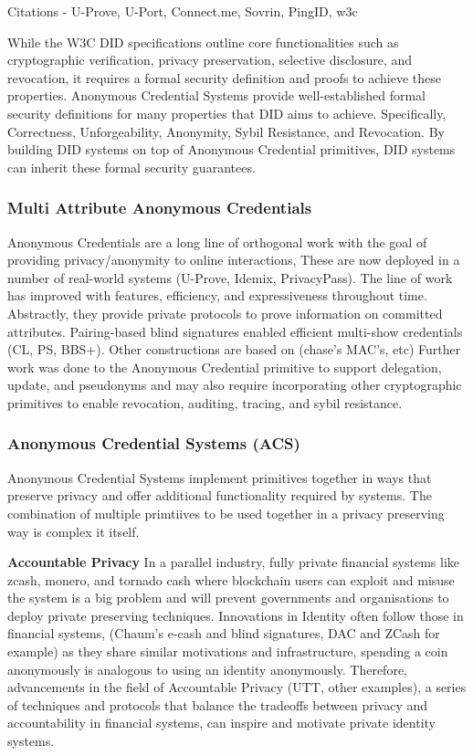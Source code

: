 Citations
- U-Prove, U-Port, Connect.me, Sovrin, PingID, w3c

While the W3C DID specifications outline core functionalities such as cryptographic verification, privacy preservation, selective disclosure, and revocation, it requires a formal security definition and proofs to achieve these properties. Anonymous Credential Systems provide well-established formal security definitions for many properties that DID aims to achieve. Specifically, Correctness, Unforgeability, Anonymity, Sybil Resistance, and Revocation. By building DID systems on top of Anonymous Credential primitives, DID systems can inherit these formal security guarantees. 

\subsubsection{Multi Attribute Anonymous Credentials} 
Anonymous Credentials are a long line of orthogonal work with the goal of providing privacy/anonymity to online interactions, These are now deployed in a number of real-world systems (U-Prove, Idemix, PrivacyPass).  
The line of work has improved with features, efficiency, and expressiveness throughout time. 
Abstractly, they provide private protocols to prove information on committed attributes. 
Pairing-based blind signatures enabled efficient multi-show credentials (CL, PS, BBS+).
Other constructions are based on (chase's MAC's, etc) 
Further work was done to the Anonymous Credential primitive to support delegation, update, and pseudonyms and may also require incorporating other cryptographic primitives to enable revocation, auditing, tracing, and sybil resistance. 

\subsubsection{Anonymous Credential Systems (ACS)} 
Anonymous Credential Systems implement primitives together in ways that preserve privacy and offer additional functionality required by systems. The combination of multiple primtiives to be used together in a privacy preserving way is complex it itself. 

\noindent \textbf{Accountable Privacy}
In a parallel industry, fully private financial systems like zcash, monero, and tornado cash where blockchain users can exploit and misuse the system is a big problem and will prevent governments and organisations to deploy private preserving techniques. Innovations in Identity often follow those in financial systems, (Chaum's e-cash and blind signatures, DAC and ZCash for example) as they share similar motivations and infrastructure, spending a coin anonymously is analogous to using an identity anonymously. Therefore, advancements in the field of Accountable Privacy (UTT, other examples), a series of techniques and protocols that balance the tradeoffs between privacy and accountability in financial systems, can inspire and motivate private identity systems.

